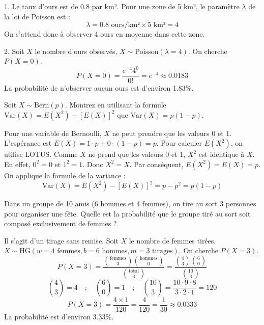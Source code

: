 \begin{correctionbox}
1. Le taux d'ours est de 0.8 par km². Pour une zone de 5 km², le paramètre $\lambda$ de la loi de Poisson est :
$$ \lambda = 0.8 \text{ ours/km²} \times 5 \text{ km²} = 4 $$
On s'attend donc à observer 4 ours en moyenne dans cette zone.

2. Soit $X$ le nombre d'ours observés, $X \sim \text{Poisson}(\lambda=4)$. On cherche $P(X=0)$.
$$ P(X=0) = \frac{e^{-4} 4^0}{0!} = e^{-4} \approx 0.0183 $$
La probabilité de n'observer aucun ours est d'environ 1.83\%.
\end{correctionbox}

\begin{exercicebox}
Soit $X \sim \text{Bern}(p)$. Montrez en utilisant la formule $\text{Var}(X) = E(X^2) - [E(X)]^2$ que $\text{Var}(X) = p(1-p)$.
\end{exercicebox}

\begin{correctionbox}
Pour une variable de Bernoulli, $X$ ne peut prendre que les valeurs 0 et 1.
L'espérance est $E(X) = 1 \cdot p + 0 \cdot (1-p) = p$.
Pour calculer $E(X^2)$, on utilise LOTUS. Comme $X$ ne prend que les valeurs 0 et 1, $X^2$ est identique à $X$.
En effet, $0^2=0$ et $1^2=1$. Donc $X^2=X$.
Par conséquent, $E(X^2) = E(X) = p$.
On applique la formule de la variance :
$$ \text{Var}(X) = E(X^2) - [E(X)]^2 = p - p^2 = p(1-p) $$
\end{correctionbox}

\begin{exercicebox}
Dans un groupe de 10 amis (6 hommes et 4 femmes), on tire au sort 3 personnes pour organiser une fête. Quelle est la probabilité que le groupe tiré au sort soit composé exclusivement de femmes ?
\end{exercicebox}

\begin{correctionbox}
Il s'agit d'un tirage sans remise. Soit $X$ le nombre de femmes tirées.
$X \sim \text{HG}(w=4 \text{ femmes}, b=6 \text{ hommes}, m=3 \text{ tirages})$.
On cherche $P(X=3)$.
$$ P(X=3) = \frac{\binom{\text{femmes}}{3} \binom{\text{hommes}}{0}}{\binom{\text{total}}{3}} = \frac{\binom{4}{3} \binom{6}{0}}{\binom{10}{3}} $$
$$ \binom{4}{3} = 4 \quad ; \quad \binom{6}{0} = 1 \quad ; \quad \binom{10}{3} = \frac{10 \cdot 9 \cdot 8}{3 \cdot 2 \cdot 1} = 120 $$
$$ P(X=3) = \frac{4 \times 1}{120} = \frac{4}{120} = \frac{1}{30} \approx 0.0333 $$
La probabilité est d'environ 3.33\%.
\end{correctionbox}

